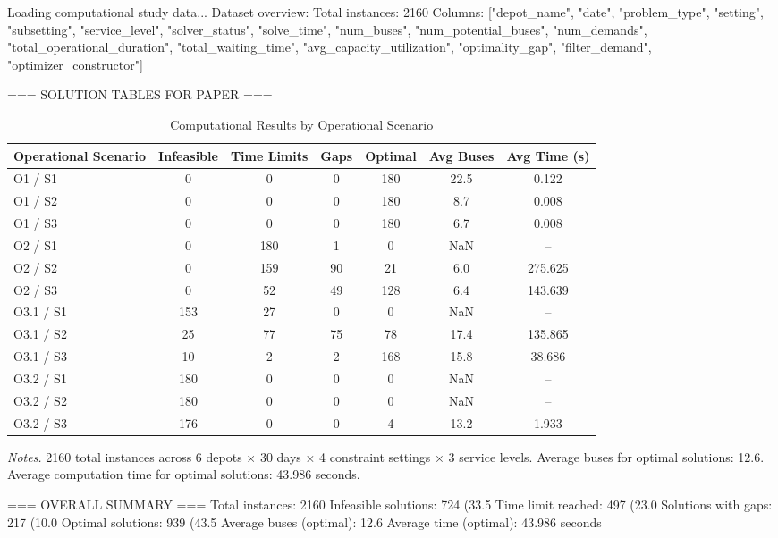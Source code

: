 Loading computational study data...
Dataset overview:
Total instances: 2160
Columns: ["depot_name", "date", "problem_type", "setting", "subsetting", "service_level", "solver_status", "solve_time", "num_buses", "num_potential_buses", "num_demands", "total_operational_duration", "total_waiting_time", "avg_capacity_utilization", "optimality_gap", "filter_demand", "optimizer_constructor"]

=== SOLUTION TABLES FOR PAPER ===

\begin{table}[ht]
\centering
\caption{Computational Results by Operational Scenario}
\label{tab:computational_results}
\begin{threeparttable}
\begin{tabular}{lcccccc}
\toprule
Operational Scenario & Infeasible & Time Limits & Gaps & Optimal & Avg Buses & Avg Time (s) \\
\midrule
O1 / S1 & 0 & 0 & 0 & 180 & 22.5 & 0.122 \\
O1 / S2 & 0 & 0 & 0 & 180 & 8.7 & 0.008 \\
O1 / S3 & 0 & 0 & 0 & 180 & 6.7 & 0.008 \\
O2 / S1 & 0 & 180 & 1 & 0 & NaN & -- \\
O2 / S2 & 0 & 159 & 90 & 21 & 6.0 & 275.625 \\
O2 / S3 & 0 & 52 & 49 & 128 & 6.4 & 143.639 \\
O3.1 / S1 & 153 & 27 & 0 & 0 & NaN & -- \\
O3.1 / S2 & 25 & 77 & 75 & 78 & 17.4 & 135.865 \\
O3.1 / S3 & 10 & 2 & 2 & 168 & 15.8 & 38.686 \\
O3.2 / S1 & 180 & 0 & 0 & 0 & NaN & -- \\
O3.2 / S2 & 180 & 0 & 0 & 0 & NaN & -- \\
O3.2 / S3 & 176 & 0 & 0 & 4 & 13.2 & 1.933 \\
\bottomrule
\end{tabular}
\begin{tablenotes}
      \smaller
      \item \textit{Notes.} 2160 total instances across 6 depots × 30 days × 4 constraint settings × 3 service levels. Average buses for optimal solutions: 12.6. Average computation time for optimal solutions: 43.986 seconds.
\end{tablenotes}
\end{threeparttable}
\end{table}


=== OVERALL SUMMARY ===
Total instances: 2160
Infeasible solutions: 724 (33.5%
Time limit reached: 497 (23.0%
Solutions with gaps: 217 (10.0%
Optimal solutions: 939 (43.5%
Average buses (optimal): 12.6
Average time (optimal): 43.986 seconds
